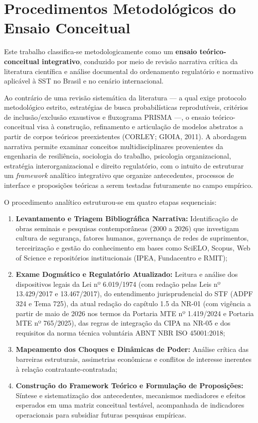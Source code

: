 \documentclass[12pt,a4paper]{article}
\begin{document}
\section{Procedimentos Metodológicos do Ensaio Conceitual}

Este trabalho classifica-se metodologicamente como um \textbf{ensaio teórico-conceitual integrativo}, conduzido por meio de revisão narrativa crítica da literatura científica e análise documental do ordenamento regulatório e normativo aplicável à SST no Brasil e no cenário internacional.

Ao contrário de uma revisão sistemática da literatura — a qual exige protocolo metodológico estrito, estratégias de busca probabilísticas reprodutíveis, critérios de inclusão/exclusão exaustivos e fluxograma PRISMA —, o ensaio teórico-conceitual visa à construção, refinamento e articulação de modelos abstratos a partir de corpos teóricos preexistentes (CORLEY; GIOIA, 2011). A abordagem narrativa permite examinar conceitos multidisciplinares provenientes da engenharia de resiliência, sociologia do trabalho, psicologia organizacional, estratégia interorganizacional e direito regulatório, com o intuito de estruturar um \textit{framework} analítico integrativo que organize antecedentes, processos de interface e proposições teóricas a serem testadas futuramente no campo empírico.

O procedimento analítico estruturou-se em quatro etapas sequenciais:
\begin{enumerate}[label=\alph*)]
  \item \textbf{Levantamento e Triagem Bibliográfica Narrativa:} Identificação de obras seminais e pesquisas contemporâneas (2000 a 2026) que investigam cultura de segurança, fatores humanos, governança de redes de suprimentos, terceirização e gestão do conhecimento em bases como SciELO, Scopus, Web of Science e repositórios institucionais (IPEA, Fundacentro e RMIT);
  \item \textbf{Exame Dogmático e Regulatório Atualizado:} Leitura e análise dos dispositivos legais da Lei nº 6.019/1974 (com redação pelas Leis nº 13.429/2017 e 13.467/2017), do entendimento jurisprudencial do STF (ADPF 324 e Tema 725), da atual redação do capítulo 1.5 da NR-01 (com vigência a partir de maio de 2026 nos termos da Portaria MTE nº 1.419/2024 e Portaria MTE nº 765/2025), das regras de integração da CIPA na NR-05 e dos requisitos da norma técnica voluntária ABNT NBR ISO 45001:2018;
  \item \textbf{Mapeamento dos Choques e Dinâmicas de Poder:} Análise crítica das barreiras estruturais, assimetrias econômicas e conflitos de interesse inerentes à relação contratante-contratada;
  \item \textbf{Construção do Framework Teórico e Formulação de Proposições:} Síntese e sistematização dos antecedentes, mecanismos mediadores e efeitos esperados em uma matriz conceitual testável, acompanhada de indicadores operacionais para subsidiar futuras pesquisas empíricas.
\end{enumerate}
\end{document}

